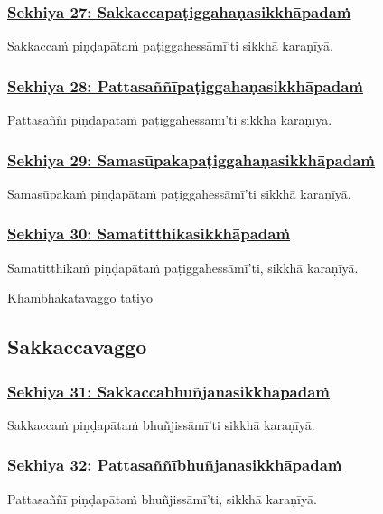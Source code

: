 \subsubsection*{\hyperref[training27]{Sekhiya 27: Sakkaccapaṭiggahaṇasikkhāpadaṁ}}
\label{sekh27}
Sakkaccaṁ piṇḍapātaṁ paṭiggahessāmī'ti sikkhā karaṇīyā.

\subsubsection*{\hyperref[training28]{Sekhiya 28: Pattasaññīpaṭiggahaṇasikkhāpadaṁ}}
\label{sekh28}
Pattasaññī piṇḍapātaṁ paṭiggahessāmī'ti sikkhā karaṇīyā.

\subsubsection*{\hyperref[training29]{Sekhiya 29: Samasūpakapaṭiggahaṇasikkhāpadaṁ}}
\label{sekh29}
Samasūpakaṁ piṇḍapātaṁ paṭiggahessāmī'ti sikkhā karaṇīyā.

\subsubsection*{\hyperref[training30]{Sekhiya 30: Samatitthikasikkhāpadaṁ}}
\label{sekh30}
Samatitthikaṁ piṇḍapātaṁ paṭiggahessāmī'ti, sikkhā karaṇīyā.

\begin{center}
  Khambhakatavaggo tatiyo
\end{center}

\subsection{Sakkaccavaggo}
\vspace{0.2cm}

\subsubsection*{\hyperref[training31]{Sekhiya 31: Sakkaccabhuñjanasikkhāpadaṁ}}
\label{sekh31}
Sakkaccaṁ piṇḍapātaṁ bhuñjissāmī'ti sikkhā karaṇīyā.

\subsubsection*{\hyperref[training32]{Sekhiya 32: Pattasaññībhuñjanasikkhāpadaṁ}}
\label{sekh32}
Pattasaññī piṇḍapātaṁ bhuñjissāmī'ti, sikkhā karaṇīyā.

